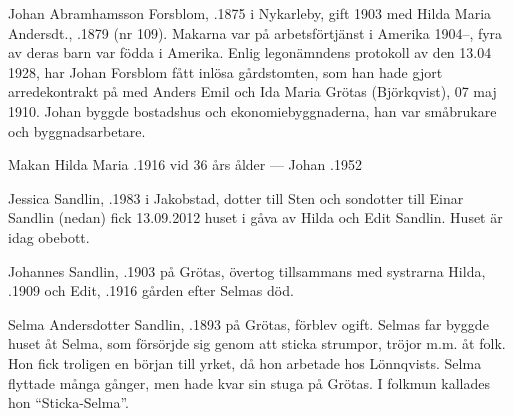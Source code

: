 %
Johan Abramhamsson Forsblom, .1875 i Nykarleby, gift 1903 med Hilda Maria Andersdt., .1879 (nr 109). Makarna var på arbetsförtjänst i Amerika 1904--, fyra av deras barn var födda i Amerika. Enlig legonämndens protokoll av den 13.04 1928, har Johan Forsblom fått inlösa gårdstomten, som han hade gjort arredekontrakt  på  med Anders Emil och Ida Maria Grötas (Björkqvist), 07 maj 1910. Johan byggde bostadshus och ekonomiebyggnaderna, han var småbrukare och byggnadsarbetare.
\begin{jhchildren}
  \item {}
  \item {}
  \item {}
  \item {}
  \item {}
\end{jhchildren}

Makan Hilda Maria .1916 vid 36 års ålder  ---  Johan .1952



%



%
Jessica Sandlin, .1983  i Jakobstad, dotter till Sten och sondotter till Einar Sandlin (nedan) fick 13.09.2012 huset i gåva av Hilda och Edit Sandlin. Huset är idag obebott.\jhvspace{}


%
Johannes Sandlin, .1903 på Grötas, övertog tillsammans med systrarna Hilda, .1909 och Edit, .1916 gården efter Selmas död.\jhvspace{}


%
Selma Andersdotter Sandlin, .1893 på Grötas, förblev ogift. Selmas far byggde huset åt Selma, som försörjde sig genom att sticka strumpor, tröjor m.m. åt folk. Hon fick troligen en början till yrket, då hon arbetade hos Lönnqvists. Selma flyttade många gånger, men hade kvar sin stuga på Grötas. I folkmun kallades hon ``Sticka-Selma''.

